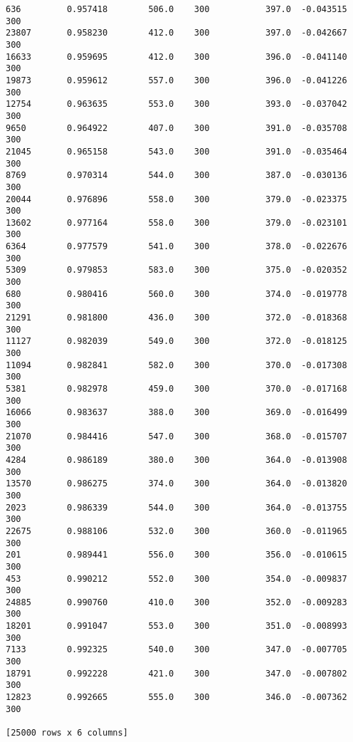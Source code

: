 \documentclass[11pt]{article}
\begin{document}
\begin{Verbatim}[commandchars=\\\{\}]
636         0.957418        506.0    300           397.0  -0.043515        300
23807       0.958230        412.0    300           397.0  -0.042667        300
16633       0.959695        412.0    300           396.0  -0.041140        300
19873       0.959612        557.0    300           396.0  -0.041226        300
12754       0.963635        553.0    300           393.0  -0.037042        300
9650        0.964922        407.0    300           391.0  -0.035708        300
21045       0.965158        543.0    300           391.0  -0.035464        300
8769        0.970314        544.0    300           387.0  -0.030136        300
20044       0.976896        558.0    300           379.0  -0.023375        300
13602       0.977164        558.0    300           379.0  -0.023101        300
6364        0.977579        541.0    300           378.0  -0.022676        300
5309        0.979853        583.0    300           375.0  -0.020352        300
680         0.980416        560.0    300           374.0  -0.019778        300
21291       0.981800        436.0    300           372.0  -0.018368        300
11127       0.982039        549.0    300           372.0  -0.018125        300
11094       0.982841        582.0    300           370.0  -0.017308        300
5381        0.982978        459.0    300           370.0  -0.017168        300
16066       0.983637        388.0    300           369.0  -0.016499        300
21070       0.984416        547.0    300           368.0  -0.015707        300
4284        0.986189        380.0    300           364.0  -0.013908        300
13570       0.986275        374.0    300           364.0  -0.013820        300
2023        0.986339        544.0    300           364.0  -0.013755        300
22675       0.988106        532.0    300           360.0  -0.011965        300
201         0.989441        556.0    300           356.0  -0.010615        300
453         0.990212        552.0    300           354.0  -0.009837        300
24885       0.990760        410.0    300           352.0  -0.009283        300
18201       0.991047        553.0    300           351.0  -0.008993        300
7133        0.992325        540.0    300           347.0  -0.007705        300
18791       0.992228        421.0    300           347.0  -0.007802        300
12823       0.992665        555.0    300           346.0  -0.007362        300

[25000 rows x 6 columns]

    \end{Verbatim}


    
    
    
    
\end{document}
